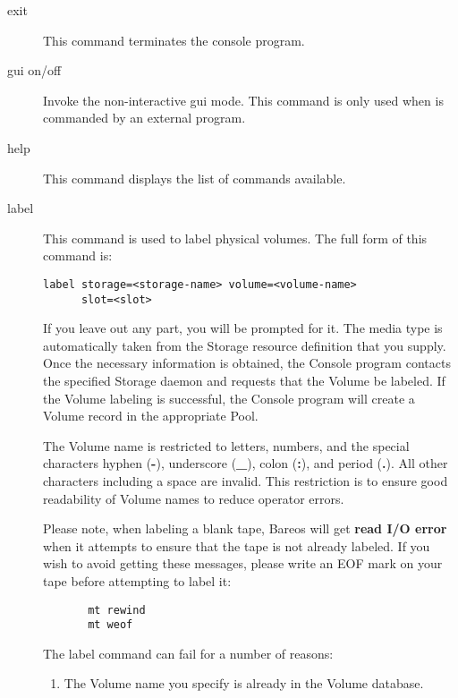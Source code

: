 \begin{description}
\item [exit]
   This command terminates the console program.

\item [gui on/off]
    Invoke the non-interactive gui mode.
    This command is only used when  is commanded by an external program.

\item [help]
   This command displays the list of commands available.

\item [label]
   This command is used to label physical volumes.  The full form of this command
   is:

\begin{verbatim}
label storage=<storage-name> volume=<volume-name>
      slot=<slot>
\end{verbatim}

   If you leave out any part, you will be prompted for it.  The media type
   is automatically taken from the Storage resource definition that you
   supply.  Once the necessary information is obtained, the Console program
   contacts the specified Storage daemon and requests that the Volume be
   labeled.  If the Volume labeling is successful, the Console program will
   create a Volume record in the appropriate Pool.

   The Volume name is restricted to letters, numbers, and the special
   characters hyphen ({\bf -}), underscore ({\bf \_}), colon ({\bf :}), and
   period ({\bf .}).  All other characters including a space are invalid.
   This restriction is to ensure good readability of Volume names to reduce
   operator errors.

   Please note, when labeling a blank tape, Bareos will get {\bf read I/O
   error} when it attempts to ensure that the tape is not already labeled.  If
   you wish to avoid getting these messages, please write an EOF mark on
   your tape before attempting to label it:

\footnotesize
\begin{verbatim}
       mt rewind
       mt weof
\end{verbatim}
\normalsize

The label command can fail for a number of reasons:

\begin{enumerate}
\item The Volume name you specify is already in the  Volume database.


\end{enumerate}
\end{description}
